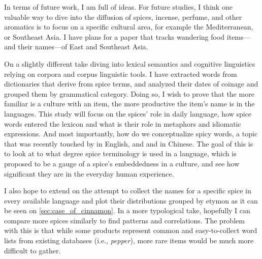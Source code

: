 In terms of future work, I am full of ideas. For future studies, I think one valuable way to dive into the diffusion of spices, incense, perfume, and other aromatics is to focus on a specific cultural area, for example the Mediterranean, or Southeast Asia. I have plans for a paper that tracks wandering food items---and their names---of East and Southeast Asia. 


On a slightly different take diving into lexical semantics and cognitive linguistics relying on corpora and corpus linguistic tools. I have extracted words from dictionaries that derive from spice terms, and analyzed their dates of coinage and grouped them by grammatical category. Doing so, I wish to prove that the more familiar is a culture with an item, the more productive the item's name is in the languages. This study will focus on the spices' role in daily language, how spice words entered the lexicon and what is their role in metaphors and idiomatic expressions. And most importantly, how do we conceptualize spicy words, a topic that was recently touched by \textcite{bagli_tastes_2021} in English, and \textcite{dong_corpus-based_2018} and \textcite{zhong_bodily_2021} in Chinese. The goal of this is to  look at to what degree spice terminology is used in a language, which is proposed to be a gauge of a spice's embeddedness in a culture, and see how significant they are in the everyday human experience.

I also hope to extend on the attempt to collect the names for a specific spice in every available language and plot their distributions grouped by etymon as it can be seen on \cref{sec:case_of_cinnamon}. In a more typological take, hopefully I can compare more spices similarly to find patterns and correlations. The problem with this is that while some products represent common and easy-to-collect word lists from existing databases (i.e., \textit{pepper}), more rare items would be much more difficult to gather. 

